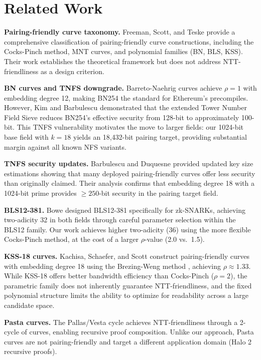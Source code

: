 \section{Related Work}

\textbf{Pairing-friendly curve taxonomy.} Freeman, Scott, and Teske
\cite{FreemanScottTeske2010} provide a comprehensive classification of
pairing-friendly curve constructions, including the Cocks-Pinch method,
MNT curves, and polynomial families (BN, BLS, KSS). Their work
establishes the theoretical framework but does not address
NTT-friendliness as a design criterion.

\textbf{BN curves and TNFS downgrade.} Barreto-Naehrig curves
\cite{BarretoNaehrig2005} achieve \(\rho = 1\) with embedding degree
12, making BN254 the standard for Ethereum's precompiles. However, Kim
and Barbulescu \cite{KimBarbulescu2016} demonstrated that the extended
Tower Number Field Sieve reduces BN254's effective security from 128-bit
to approximately 100-bit. This TNFS vulnerability motivates the move to
larger fields: our 1024-bit base field with \(k=18\) yields an
18,432-bit pairing target, providing substantial margin against all
known NFS variants.

\textbf{TNFS security updates.} Barbulescu and Duquesne
\cite{BarbulescuDuquesne2019} provided updated key size estimations
showing that many deployed pairing-friendly curves offer less security
than originally claimed. Their analysis confirms that embedding degree
18 with a 1024-bit prime provides \(\geq 250\)-bit security in the
pairing target field.

\textbf{BLS12-381.} Bowe \cite{BLS12_381} designed BLS12-381
specifically for zk-SNARKs, achieving two-adicity 32 in both fields
through careful parameter selection within the BLS12 family. Our work
achieves higher two-adicity (36) using the more flexible Cocks-Pinch
method, at the cost of a larger \(\rho\)-value (2.0 vs.~1.5).

\textbf{KSS-18 curves.} Kachisa, Schaefer, and Scott \cite{KSS2008}
construct pairing-friendly curves with embedding degree 18 using the
Brezing-Weng method \cite{BrezingWeng2005}, achieving
\(\rho \approx 1.33\). While KSS-18 offers better bandwidth efficiency
than Cocks-Pinch (\(\rho = 2\)), the parametric family does not
inherently guarantee NTT-friendliness, and the fixed polynomial
structure limits the ability to optimize for readability across a large
candidate space.

\textbf{Pasta curves.} The Pallas/Vesta cycle \cite{PastaCurves}
achieves NTT-friendliness through a 2-cycle of curves, enabling
recursive proof composition. Unlike our approach, Pasta curves are not
pairing-friendly and target a different application domain (Halo 2
recursive proofs).

